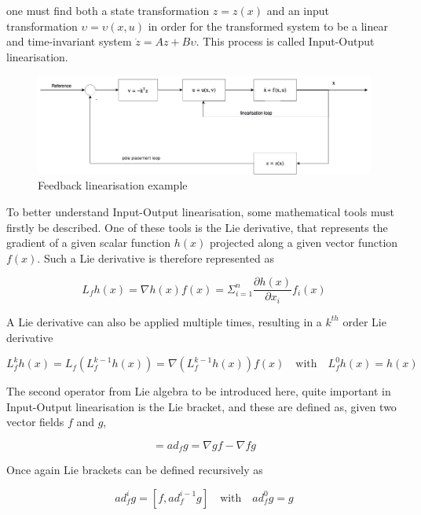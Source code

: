 one must find both a state transformation $z=z(x)$ and an input transformation $\upsilon = \upsilon(x,u)$ in order for the transformed system to be a linear and time-invariant system $\dot{z} = Az+B\upsilon$. This process is called Input-Output linearisation. 

\begin{figure}[!htb]
  \centering
  \includegraphics[width=1\textwidth]{Figures/NLI}
  \caption[Feedback linearisation example]{Feedback linearisation example \cite{Slotine+Li}}
  \label{fig:nli}
\end{figure}

To better understand Input-Output linearisation, some mathematical tools must firstly be described. One of these tools is the Lie derivative, that represents the gradient of a given scalar function $h(x)$ projected along a given vector function $f(x)$. Such a Lie derivative is therefore represented as

\begin{equation}
L_fh(x) = \nabla h(x)f(x) = \Sigma^n_{i=1}\dfrac{\partial h(x)}{\partial x_i}f_i(x)
\end{equation}

A Lie derivative can also be applied multiple times, resulting in a $k^{th}$ order Lie derivative

\begin{equation}
L^k_fh(x)=L_f\left(L^{k-1}_fh(x)\right)=\nabla \left(L^{k-1}_fh(x)\right)f(x) \quad \text{with} \quad L^0_fh(x)=h(x)
\end{equation}

The second operator from Lie algebra to be introduced here, quite important in Input-Output linearisation is the Lie bracket, and these are defined as, given two vector fields $f$ and $g$,

\begin{equation}
[f,g] = ad_f g = \nabla g f - \nabla f g
\end{equation}

Once again Lie brackets can be defined recursively as

\begin{equation}
ad_f^ig=[f, ad_f^{i-1}g] \quad \text{with} \quad ad_f^0g=g
\end{equation}

